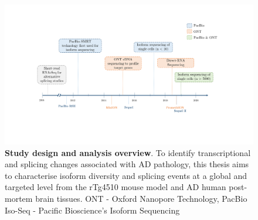 \begin{landscape}
	\begin{figure}[htb]
		\begin{center}
			\includegraphics[page=2,trim={0 0 0 0},clip,scale = 0.7]{Figures/Introduction_Figures_Landscape.pdf}
		\end{center}
		\captionsetup{width=1.5\textwidth}
		\caption[Study design and analysis overview]%
		{\textbf{Study design and analysis overview}. To identify transcriptional and splicing changes associated with AD pathology, this thesis aims to characterise isoform diversity and splicing events at a global and targeted level from the rTg4510 mouse model and AD human post-mortem brain tissues. ONT - Oxford Nanopore Technology, PacBio Iso-Seq - Pacific Bioscience's Isoform Sequencing}
		\label{fig:studydesign}
	\end{figure} 	
\end{landscape}